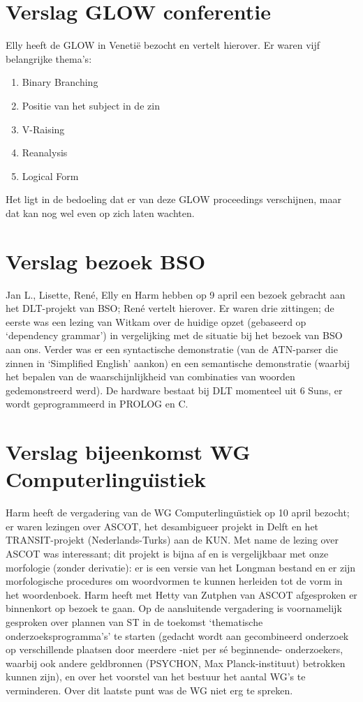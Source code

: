 \section {Verslag GLOW conferentie}

Elly heeft de GLOW in Veneti\"{e} bezocht en vertelt hierover. 
Er waren vijf belangrijke thema's:
\begin{enumerate}
  \item Binary Branching
  \item Positie van het subject in de zin
  \item V-Raising
  \item Reanalysis
  \item Logical Form
\end{enumerate}
Het ligt in de bedoeling 
dat er van deze GLOW proceedings verschijnen, maar dat kan nog wel even op zich 
laten wachten.

\section {Verslag bezoek BSO}

Jan L., Lisette, Ren\'{e}, Elly en Harm hebben op 9 april 
een bezoek gebracht aan het DLT-projekt van 
BSO; Ren\'{e} vertelt hierover. Er waren drie zittingen; de eerste was een 
lezing van Witkam over de huidige opzet (gebaseerd op `dependency grammar') in 
vergelijking met de situatie bij het bezoek van BSO aan ons. Verder was er een 
syntactische demonstratie (van de ATN-parser die zinnen in `Simplified 
English' aankon) en een semantische demonstratie (waarbij het bepalen van 
de waarschijnlijkheid van combinaties van woorden gedemonstreerd werd). De 
hardware bestaat bij DLT momenteel uit 6 Suns, er wordt geprogrammeerd in 
PROLOG en C.

\section {Verslag bijeenkomst WG Computerlingu\"{\i}stiek}

Harm heeft de vergadering van de WG Computerlingu\"{\i}stiek op 10 april 
bezocht; er waren lezingen over ASCOT, het desambigueer projekt in Delft en het 
TRANSIT-projekt (Nederlands-Turks) aan de KUN. Met name de lezing over ASCOT 
was interessant; dit projekt is bijna af en is vergelijkbaar met onze 
morfologie (zonder derivatie): er is een versie van het Longman bestand en er 
zijn morfologische procedures om woordvormen te kunnen herleiden tot de vorm in 
het woordenboek. Harm heeft met Hetty van Zutphen van ASCOT afgesproken er 
binnenkort op bezoek te gaan. Op de aansluitende vergadering is voornamelijk 
gesproken over plannen van ST in de toekomst `thematische 
onderzoeksprogramma's' te starten (gedacht wordt aan gecombineerd onderzoek op 
verschillende plaatsen door meerdere -niet per s\'{e} beginnende- onderzoekers, 
waarbij ook andere geldbronnen (PSYCHON, Max Planck-instituut) betrokken kunnen 
zijn), en over het voorstel van het bestuur het aantal WG's te verminderen. 
Over dit laatste punt was de WG niet erg te spreken.


